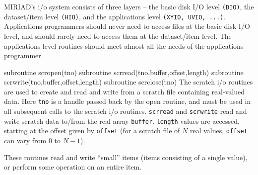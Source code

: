 %
%
MIRIAD's i/o system consists of three layers -- the basic disk I/O
level {\tt (DIO)}, the dataset/item level {\tt (HIO)},
and the applications level {\tt (XYIO, UVIO, ...)}. Applications
programmers should never need to access files at the basic disk I/O level,
and should rarely need to access them at the dataset/item level. The
applications level routines should meet almost all the needs of the
applications programmer.


{\ninepoint\begintt
      subroutine scropen(tno)
      subroutine scrread(tno,buffer,offset,length)
      subroutine scrwrite(tno,buffer,offset,length)
      subroutine scrclose(tno)
\endtt}
The scratch i/o routines are used to create and read and write from a
scratch file containing real-valued data. Here {\tt tno} is a handle passed
back by the open routine,
and must be used in all subsequent calls to the scratch i/o routines.
{\tt scrread} and {\tt scrwrite} read and write scratch data to/from the
real array {\tt buffer}. {\tt length} values are accessed, starting
at the offset given by {\tt offset} (for a scratch file of $N$ real
values, {\tt offset} can vary from 0 to $N-1$).


These routines read and write ``small'' items (items consisting of a single
value), or perform some operation on an entire item.

